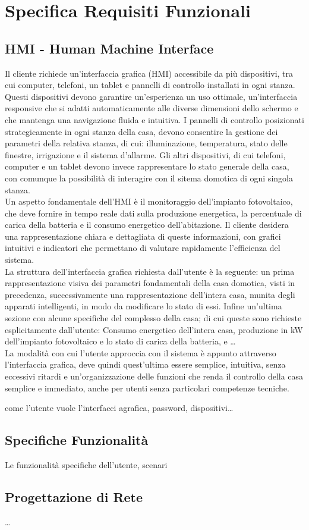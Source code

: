\documentclass[italian, 12pt, a4paper]{article}
\begin{document}
\section{Specifica Requisiti Funzionali}\label{sec:requisiti2}
\subsection{HMI - Human Machine Interface}
Il cliente richiede un’interfaccia grafica (HMI) accessibile da più dispositivi, tra cui computer, telefoni, un tablet e pannelli di controllo installati in ogni stanza. Questi dispositivi devono garantire un'esperienza un uso ottimale, un'interfaccia responsive che si adatti automaticamente alle diverse dimensioni dello schermo e che mantenga una navigazione fluida e intuitiva.  I pannelli di controllo posizionati strategicamente in ogni stanza della casa, devono consentire la gestione dei parametri della relativa stanza, di cui: illuminazione, temperatura, stato delle finestre, irrigazione e il sistema d’allarme. Gli altri dispositivi, di cui telefoni, computer e un tablet devono invece rappresentare lo stato generale della casa, con comunque la possibilità di interagire con il sitema domotica di ogni singola stanza.\\[1.5mm]
Un aspetto fondamentale dell’HMI è il monitoraggio dell’impianto fotovoltaico, che deve fornire in tempo reale dati sulla produzione energetica, la percentuale di carica della batteria e il consumo energetico dell’abitazione. Il cliente desidera una rappresentazione chiara e dettagliata di queste informazioni, con grafici intuitivi e indicatori che permettano di valutare rapidamente l’efficienza del sistema.\\[1.5mm]
La struttura dell’interfaccia grafica richiesta dall’utente è la seguente: un prima rappresentazione visiva dei parametri fondamentali della casa domotica, visti in precedenza, successivamente una rappresentazione dell’intera casa, munita degli apparati intelligenti, in modo da modificare lo stato di essi. Infine un’ultima sezione con alcune specifiche del complesso della casa; di cui queste sono richieste esplicitamente dall’utente: Consumo energetico dell’intera casa, produzione in kW dell’impianto fotovoltaico e lo stato di carica della batteria, e \ldots\\[1.5mm]
La modalità con cui l’utente approccia con il sistema è appunto attraverso l’interfaccia grafica, deve quindi quest’ultima essere semplice, intuitiva, senza eccessivi ritardi e un’organizzazione delle funzioni che renda il controllo della casa semplice e immediato, anche per utenti senza particolari competenze tecniche.

come l'utente vuole l'interfacci agrafica, password, dispositivi\ldots
\subsection{Specifiche Funzionalità}
Le funzionalità specifiche dell'utente, scenari
\subsection{Progettazione di Rete}
\ldots
\clearpage
\end{document}
